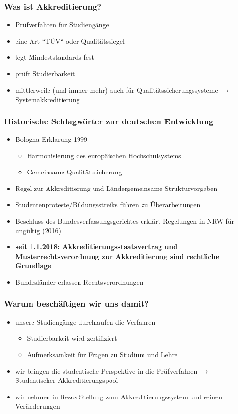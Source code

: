 \documentclass{beamer}
\begin{document}
\frame{\tableofcontents[currentsection]}
\begin{frame}
  \frametitle{Was ist Akkreditierung?}
  \begin{itemize}
  	\item Prüfverfahren für Studiengänge
  	\item eine Art ``TÜV`` oder Qualitätssiegel
  	\item legt Mindeststandards fest
  	\item prüft Studierbarkeit
  	\vspace{1cm}
  	\item mittlerweile (und immer mehr) auch für Qualitätssicherungssysteme $\rightarrow$ Systemakkreditierung
  \end{itemize}   
\end{frame}
\begin{frame} 
  \frametitle{Historische Schlagwörter zur deutschen Entwicklung} 
  \begin{itemize}
  	\item Bologna-Erklärung 1999
  		\begin{itemize}
  			\item Harmonisierung des europäischen Hochschulsystems
  			\item Gemeinsame Qualitätssicherung
  		\end{itemize}
  	\pause
  	\item Regel zur Akkreditierung und Ländergemeinsame Strukturvorgaben
  	\item Studentenproteste/Bildungsstreiks führen zu Überarbeitungen
  	\item Beschluss des Bundesverfassungsgerichtes erklärt Regelungen in NRW für ungültig (2016)
  	\vspace{1cm}
  	\pause
  	\item \textbf{seit 1.1.2018: Akkreditierungsstaatsvertrag und Musterrechtsverordnung zur Akkreditierung sind rechtliche Grundlage}
  	\item Bundesländer erlassen Rechtsverordnungen
  \end{itemize}   
\end{frame}
\begin{frame} 
  \frametitle{Warum beschäftigen wir uns damit?} 
  \begin{itemize}
  	\item unsere Studiengänge durchlaufen die Verfahren
  		\begin{itemize}
  			\item Studierbarkeit wird zertifiziert
  			\item Aufmerksamkeit für Fragen zu Studium und Lehre
  		\end{itemize}
  	\pause
  	\item wir bringen die studentische Perspektive in die Prüfverfahren $\rightarrow$ Studentischer Akkreditierungspool
  	\pause
  	\item wir nehmen in Resos Stellung zum Akkreditierungssystem und seinen Veränderungen
  \end{itemize}   
\end{frame}
\end{document}
